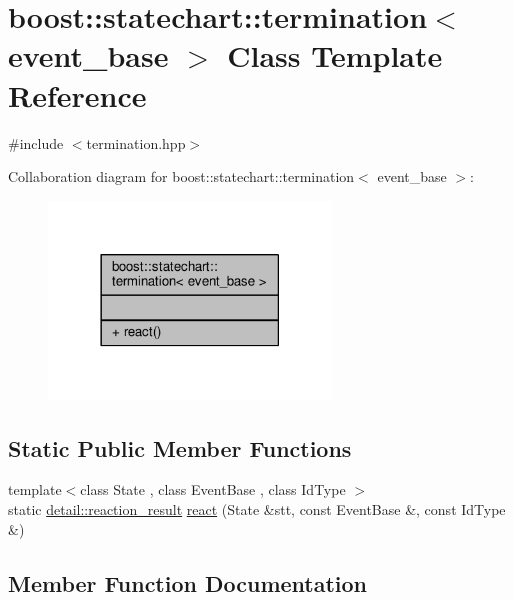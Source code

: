 \hypertarget{classboost_1_1statechart_1_1termination_3_01event__base_01_4}{}\section{boost\+:\+:statechart\+:\+:termination$<$ event\+\_\+base $>$ Class Template Reference}
\label{classboost_1_1statechart_1_1termination_3_01event__base_01_4}


{\ttfamily \#include $<$termination.\+hpp$>$}



Collaboration diagram for boost\+:\+:statechart\+:\+:termination$<$ event\+\_\+base $>$\+:
\nopagebreak
\begin{figure}[H]
\begin{center}
\leavevmode
\includegraphics[width=213pt]{classboost_1_1statechart_1_1termination_3_01event__base_01_4__coll__graph}
\end{center}
\end{figure}
\subsection*{Static Public Member Functions}
\begin{DoxyCompactItemize}
\item 
{\footnotesize template$<$class State , class Event\+Base , class Id\+Type $>$ }\\static \mbox{\hyperlink{namespaceboost_1_1statechart_1_1detail_ab091bbb4c29327fb46ee479ea1b7255b}{detail\+::reaction\+\_\+result}} \mbox{\hyperlink{classboost_1_1statechart_1_1termination_3_01event__base_01_4_a1d3e0f812c5565e405314ed26cd7300c}{react}} (State \&stt, const Event\+Base \&, const Id\+Type \&)
\end{DoxyCompactItemize}


\subsection{Member Function Documentation}
\mbox{\label{classboost_1_1statechart_1_1termination_3_01event__base_01_4_a1d3e0f812c5565e405314ed26cd7300c}} 
